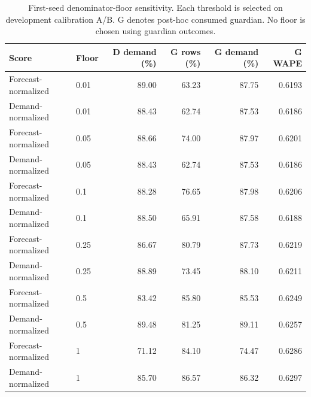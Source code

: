 \begin{table}[htbp]
\centering\small
\caption{First-seed denominator-floor sensitivity. Each threshold is selected on development calibration A/B. G denotes post-hoc consumed guardian. No floor is chosen using guardian outcomes.}
\label{tab:floors}
\begin{tabular}{llrrrr}\toprule
Score & Floor & D demand (\%) & G rows (\%) & G demand (\%) & G WAPE\\\midrule
Forecast-normalized & 0.01 & 89.00 & 63.23 & 87.75 & 0.6193 \\
Demand-normalized & 0.01 & 88.43 & 62.74 & 87.53 & 0.6186 \\
Forecast-normalized & 0.05 & 88.66 & 74.00 & 87.97 & 0.6201 \\
Demand-normalized & 0.05 & 88.43 & 62.74 & 87.53 & 0.6186 \\
Forecast-normalized & 0.1 & 88.28 & 76.65 & 87.98 & 0.6206 \\
Demand-normalized & 0.1 & 88.50 & 65.91 & 87.58 & 0.6188 \\
Forecast-normalized & 0.25 & 86.67 & 80.79 & 87.73 & 0.6219 \\
Demand-normalized & 0.25 & 88.89 & 73.45 & 88.10 & 0.6211 \\
Forecast-normalized & 0.5 & 83.42 & 85.80 & 85.53 & 0.6249 \\
Demand-normalized & 0.5 & 89.48 & 81.25 & 89.11 & 0.6257 \\
Forecast-normalized & 1 & 71.12 & 84.10 & 74.47 & 0.6286 \\
Demand-normalized & 1 & 85.70 & 86.57 & 86.32 & 0.6297 \\
\bottomrule\end{tabular}
\end{table}
